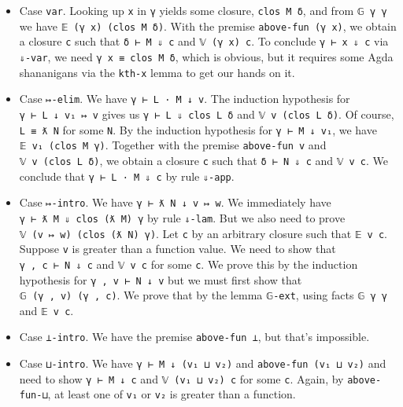 \begin{itemize}
\item
  Case \texttt{var}. Looking up \texttt{x} in
  \texttt{γ\textquotesingle{}} yields some closure,
  \texttt{clos\ M\textquotesingle{}\ δ}, and from
  \texttt{𝔾\ γ\ γ\textquotesingle{}} we have
  \texttt{𝔼\ (γ\ x)\ (clos\ M\textquotesingle{}\ δ)}. With the premise
  \texttt{above-fun\ (γ\ x)}, we obtain a closure \texttt{c} such that
  \texttt{δ\ ⊢\ M\textquotesingle{}\ ⇓\ c} and \texttt{𝕍\ (γ\ x)\ c}. To
  conclude \texttt{γ\textquotesingle{}\ ⊢\ x\ ⇓\ c} via \texttt{⇓-var},
  we need
  \texttt{γ\textquotesingle{}\ x\ ≡\ clos\ M\textquotesingle{}\ δ},
  which is obvious, but it requires some Agda shananigans via the
  \texttt{kth-x} lemma to get our hands on it.
\item
  Case \texttt{↦-elim}. We have \texttt{γ\ ⊢\ L\ ·\ M\ ↓\ v}. The
  induction hypothesis for \texttt{γ\ ⊢\ L\ ↓\ v₁\ ↦\ v} gives us
  \texttt{γ\textquotesingle{}\ ⊢\ L\ ⇓\ clos\ L\textquotesingle{}\ δ}
  and \texttt{𝕍\ v\ (clos\ L\textquotesingle{}\ δ)}. Of course,
  \texttt{L\textquotesingle{}\ ≡\ ƛ\ N} for some \texttt{N}. By the
  induction hypothesis for \texttt{γ\ ⊢\ M\ ↓\ v₁}, we have
  \texttt{𝔼\ v₁\ (clos\ M\ γ\textquotesingle{})}. Together with the
  premise \texttt{above-fun\ v} and
  \texttt{𝕍\ v\ (clos\ L\textquotesingle{}\ δ)}, we obtain a closure
  \texttt{c\textquotesingle{}} such that
  \texttt{δ\ ⊢\ N\ ⇓\ c\textquotesingle{}} and
  \texttt{𝕍\ v\ c\textquotesingle{}}. We conclude that
  \texttt{γ\textquotesingle{}\ ⊢\ L\ ·\ M\ ⇓\ c\textquotesingle{}} by
  rule \texttt{⇓-app}.
\item
  Case \texttt{↦-intro}. We have \texttt{γ\ ⊢\ ƛ\ N\ ↓\ v\ ↦\ w}. We
  immediately have
  \texttt{γ\textquotesingle{}\ ⊢\ ƛ\ M\ ⇓\ clos\ (ƛ\ M)\ γ\textquotesingle{}}
  by rule \texttt{⇓-lam}. But we also need to prove
  \texttt{𝕍\ (v\ ↦\ w)\ (clos\ (ƛ\ N)\ γ\textquotesingle{})}. Let
  \texttt{c} by an arbitrary closure such that \texttt{𝔼\ v\ c}. Suppose
  \texttt{v\textquotesingle{}} is greater than a function value. We need
  to show that
  \texttt{γ\textquotesingle{}\ ,\ c\ ⊢\ N\ ⇓\ c\textquotesingle{}} and
  \texttt{𝕍\ v\textquotesingle{}\ c\textquotesingle{}} for some
  \texttt{c\textquotesingle{}}. We prove this by the induction
  hypothesis for \texttt{γ\ ,\ v\ ⊢\ N\ ↓\ v\textquotesingle{}} but we
  must first show that
  \texttt{𝔾\ (γ\ ,\ v)\ (γ\textquotesingle{}\ ,\ c)}. We prove that by
  the lemma \texttt{𝔾-ext}, using facts
  \texttt{𝔾\ γ\ γ\textquotesingle{}} and \texttt{𝔼\ v\ c}.
\item
  Case \texttt{⊥-intro}. We have the premise \texttt{above-fun\ ⊥}, but
  that's impossible.
\item
  Case \texttt{⊔-intro}. We have \texttt{γ\ ⊢\ M\ ↓\ (v₁\ ⊔\ v₂)} and
  \texttt{above-fun\ (v₁\ ⊔\ v₂)} and need to show
  \texttt{γ\textquotesingle{}\ ⊢\ M\ ↓\ c} and
  \texttt{𝕍\ (v₁\ ⊔\ v₂)\ c} for some \texttt{c}. Again, by
  \texttt{above-fun-⊔}, at least one of \texttt{v₁} or \texttt{v₂} is
  greater than a function.


\end{itemize}
